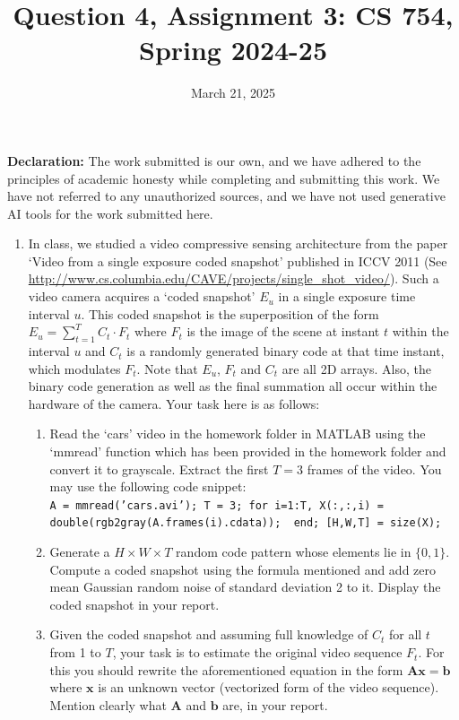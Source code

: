 \documentclass{article}
\title{Question 4, Assignment 3: CS 754, Spring 2024-25}
\author{
\IEEEauthorblockN{
    \begin{tabular}{cccc}
        \begin{minipage}[t]{0.23\textwidth}
            \centering
            Amitesh Shekhar\\
            IIT Bombay\\
            22b0014@iitb.ac.in
        \end{minipage} & 
        \begin{minipage}[t]{0.23\textwidth}
            \centering
            Anupam Rawat\\
            IIT Bombay\\
            22b3982@iitb.ac.in
        \end{minipage} & 
        \begin{minipage}[t]{0.23\textwidth}
            \centering
            Toshan Achintya Golla\\
            IIT Bombay\\
            22b2234@iitb.ac.in
        \end{minipage} \\
        \\ 
    \end{tabular}
}
}
\date{March 21, 2025}
\begin{document}
\maketitle

\textbf{Declaration:} The work submitted is our own, and
we have adhered to the principles of academic honesty while completing and submitting this work. We have not
referred to any unauthorized sources, and we have not used generative AI tools for the work submitted here.

\begin{enumerate}
\item In class, we studied a video compressive sensing architecture from the paper `Video from a single exposure coded snapshot' published in ICCV 2011 (See \url{http://www.cs.columbia.edu/CAVE/projects/single_shot_video/}). Such a video camera acquires a `coded snapshot' $E_u$ in a single exposure time interval $u$. This coded snapshot is the superposition of the form $E_u = \sum_{t=1}^T C_t \cdot F_t$ where $F_t$ is the image of the scene at instant $t$ within the interval $u$ and $C_t$ is a randomly generated binary code at that time instant, which modulates $F_t$. Note that $E_u$, $F_t$ and $C_t$ are all 2D arrays. Also, the binary code generation as well as the final summation all occur within the hardware of the camera. Your task here is as follows:
\begin{enumerate}
\item Read the `cars' video in the homework folder in MATLAB using the `mmread' function which has been provided in the homework folder and convert it to grayscale. Extract the first $T = 3$ frames of the video. You may use the following code snippet: \\
\texttt{A = mmread('cars.avi');
T = 3;
for i=1:T,  X(:,:,i) = double(rgb2gray(A.frames(i).cdata)); \ end;
[H,W,T] = size(X);
}
\item Generate a $H \times W \times T$ random code pattern whose elements lie in $\{0,1\}$. Compute a coded snapshot using the formula mentioned and add zero mean Gaussian random noise of standard deviation 2 to it. Display the coded snapshot in your report.
\item Given the coded snapshot and assuming full knowledge of $C_t$ for all $t$ from 1 to $T$, your task is to estimate the original video sequence $F_t$. For this you should rewrite the aforementioned equation in the form $\boldsymbol{Ax} = \boldsymbol{b}$ where $\boldsymbol{x}$ is an unknown vector (vectorized form of the video sequence). Mention clearly what $\boldsymbol{A}$ and $\boldsymbol{b}$ are, in your report.

\end{enumerate}
\end{enumerate}
\end{document}
